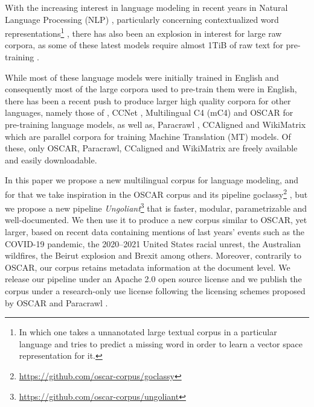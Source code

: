 With the increasing interest in language modeling in recent years in Natural Language Processing (NLP) \citep{rogers-etal-2020-primer}, particularly concerning contextualized word representations\footnote{In which one takes a unnanotated large textual corpus in a particular language and tries to predict a missing word in order to learn a vector space representation for it.} \citep{peters-etal-2018-deep,devlin-etal-2019-bert}, there has also been an explosion in interest for large raw corpora, as some of these latest models require almost 1TiB of raw text for pre-training \citep{raffel-etal-2020-exploring,brown-etal-2020-language}.

While most of these language models were initially trained in English \citep{devlin-etal-2019-bert,yang-etal-2019-xlnet,clark-etal-2020-electra,zaheer-etal-2020-big,xiong2021nystromformer} and consequently most of the large corpora used to pre-train them were in English, there has been a recent push to produce larger high quality corpora for other languages, namely those of \citet{grave-etal-2018-learning}, CCNet \citep{wenzek-etal-2020-ccnet}, Multilingual C4 (mC4) \citep{xue-etal-2020-mt5} and OSCAR \citep{ortiz-suarez-etal-2019-asynchronous,ortiz-suarez-etal-2020-monolingual} for pre-training language models, as well as, Paracrawl \citep{espla-etal-2019-paracrawl,banon-etal-2020-paracrawl}, CCAligned \citep{el-kishky-etal-2020-ccaligned} and WikiMatrix \citep{schwenk-etal-2021-wikimatrix} which are parallel corpora for training Machine Translation (MT) models. Of these, only OSCAR, Paracrawl, CCaligned and WikiMatrix are freely available and easily downloadable.

In this paper we propose a new multilingual corpus for language modeling, and for that we take inspiration in the OSCAR corpus and its pipeline goclassy\footnote{\url{https://github.com/oscar-corpus/goclassy}} \citep{ortiz-suarez-etal-2019-asynchronous,ortiz-suarez-etal-2020-monolingual}, but we propose a new pipeline \emph{Ungoliant}\footnote{\url{https://github.com/oscar-corpus/ungoliant}} that is faster, modular, parametrizable and well-documented. We then use it to produce a new corpus similar to OSCAR, yet larger, based on recent data containing mentions of last years' events such as the COVID-19 pandemic, the 2020–2021 United States racial unrest, the Australian wildfires, the Beirut explosion and Brexit among others. Moreover, contrarily to OSCAR, our corpus retains metadata information at the document level. We release our pipeline under an Apache 2.0 open source license and we publish the corpus under a research-only use license following the licensing schemes proposed by OSCAR \citep{ortiz-suarez-etal-2019-asynchronous,ortiz-suarez-etal-2020-monolingual} and Paracrawl \citep{espla-etal-2019-paracrawl,banon-etal-2020-paracrawl}.


